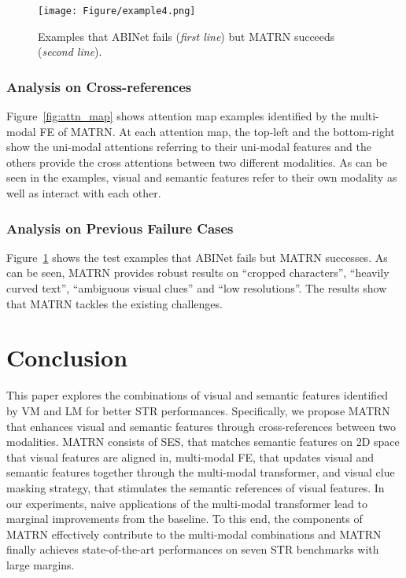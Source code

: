 \documentclass[runningheads]{llncs}
\begin{document}
\begin{figure}[t]
\centering
    \texttt{[image: Figure/example4.png]}
    \caption{Examples that ABINet fails (\textit{first line}) but MATRN succeeds (\textit{second line}).}
    \label{fig:examples}
\end{figure}

\subsubsection{Analysis on Cross-references}

Figure~\ref{fig:attn_map} shows attention map examples identified by the multi-modal FE of MATRN. At each attention map, the top-left and the bottom-right show the uni-modal attentions referring to their uni-modal features and the others provide the cross attentions between two different modalities. As can be seen in the examples, visual and semantic features refer to their own modality as well as interact with each other. 

\subsubsection{Analysis on Previous Failure Cases}

Figure~\ref{fig:examples} shows the test examples that ABINet fails but MATRN successes. As can be seen, MATRN provides robust results on ``cropped characters'', ``heavily curved text'', ``ambiguous visual clues'' and ``low resolutions''. The results show that MATRN tackles the existing challenges.

\section{Conclusion}

This paper explores the combinations of visual and semantic features identified by VM and LM for better STR performances. 
Specifically, we propose MATRN that enhances visual and semantic features through cross-references between two modalities.
MATRN consists of SES, that matches semantic features on 2D space that visual features are aligned in, multi-modal FE, that updates visual and semantic features together through the multi-modal transformer, and visual clue masking strategy, that stimulates the semantic references of visual features. In our experiments, naive applications of the multi-modal transformer lead to marginal improvements from the baseline. To this end, the components of MATRN effectively contribute to the multi-modal combinations and MATRN finally achieves state-of-the-art performances on seven STR benchmarks with large margins.


\clearpage


\end{document}
